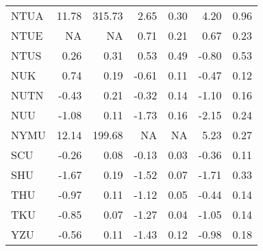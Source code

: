 \begin{longtable}[t]{lrrrrrr}
\hspace{1em}NTUA & 11.78 & 315.73 & 2.65 & 0.30 & 4.20 & 0.96\\
\hspace{1em}NTUE & NA & NA & 0.71 & 0.21 & 0.67 & 0.23\\
\hspace{1em}NTUS & 0.26 & 0.31 & 0.53 & 0.49 & -0.80 & 0.53\\
\hspace{1em}NUK & 0.74 & 0.19 & -0.61 & 0.11 & -0.47 & 0.12\\
\hspace{1em}NUTN & -0.43 & 0.21 & -0.32 & 0.14 & -1.10 & 0.16\\
\hspace{1em}NUU & -1.08 & 0.11 & -1.73 & 0.16 & -2.15 & 0.24\\
\hspace{1em}NYMU & 12.14 & 199.68 & NA & NA & 5.23 & 0.27\\
\hspace{1em}SCU & -0.26 & 0.08 & -0.13 & 0.03 & -0.36 & 0.11\\
\hspace{1em}SHU & -1.67 & 0.19 & -1.52 & 0.07 & -1.71 & 0.33\\
\hspace{1em}THU & -0.97 & 0.11 & -1.12 & 0.05 & -0.44 & 0.14\\
\hspace{1em}TKU & -0.85 & 0.07 & -1.27 & 0.04 & -1.05 & 0.14\\
\hspace{1em}YZU & -0.56 & 0.11 & -1.43 & 0.12 & -0.98 & 0.18\\*
\end{longtable}
